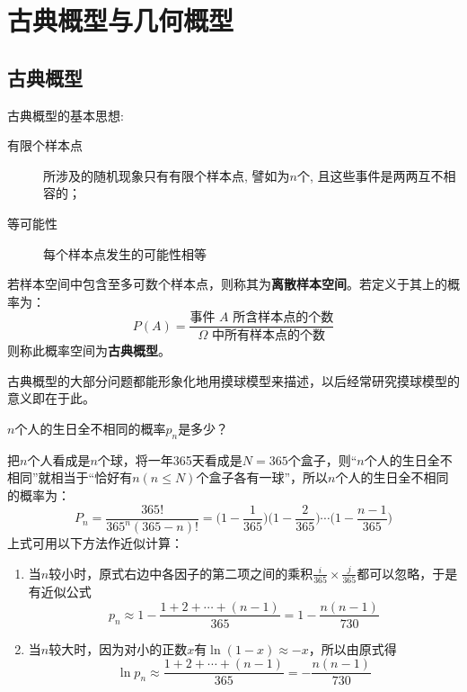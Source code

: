 \section{古典概型与几何概型}

\subsection{古典概型}

古典概型的基本思想:
\begin{description}
    \item[有限个样本点] 所涉及的随机现象只有有限个样本点, 譬如为$n$个, 且这些事件是两两互不相容的；
    \item[等可能性] 每个样本点发生的可能性相等
\end{description}

\begin{definition}[古典概型]
    若样本空间中包含至多可数个样本点，则称其为\textbf{离散样本空间}。若定义于其上的概率为：
    \[  P(A) = \frac{\text{事件 } A \text{ 所含样本点的个数}}{\Omega \text{ 中所有样本点的个数}} \]
    则称此概率空间为\textbf{古典概型}。
\end{definition}
\begin{note}
    古典概型的大部分问题都能形象化地用摸球模型来描述，以后经常研究摸球模型的意义即在于此。
\end{note}

\begin{example}[生日问题]
    $n$个人的生日全不相同的概率$p_n$是多少？
\end{example}
\begin{solution}
    把$n$个人看成是$n$个球，将一年365天看成是$N=365$个盒子，则“$n$个人的生日全不相同”就相当于“恰好有$n (n \le N)$个盒子各有一球”，所以$n$个人的生日全不相同的概率为：
    \[ P_n = \frac{365!}{365^n (365 - n)!} = \biggl(1 - \frac1{365}\biggr) \biggl(1 - \frac{2}{365}\biggr) \dotsb \biggl(1 - \frac{n - 1}{365}\biggr) \]
    上式可用以下方法作近似计算：
    \begin{enumerate}
        \item 当$n$较小时，原式右边中各因子的第二项之间的乘积$\frac{i}{365} \times \frac{j}{365}$都可以忽略，于是有近似公式
              \[ p_n \approx 1 - \frac{1 + 2 + \dotsb + (n - 1)}{365}  = 1 - \frac{n (n - 1)}{730}\]
        \item 当$n$较大时，因为对小的正数$x$有$\ln (1-x) \approx -x$，所以由原式得
              \[ \ln p_n \approx \frac{1 + 2 + \dotsb + (n - 1)}{365} = -\frac{n (n - 1)}{730}\]
    \end{enumerate}
\end{solution}

